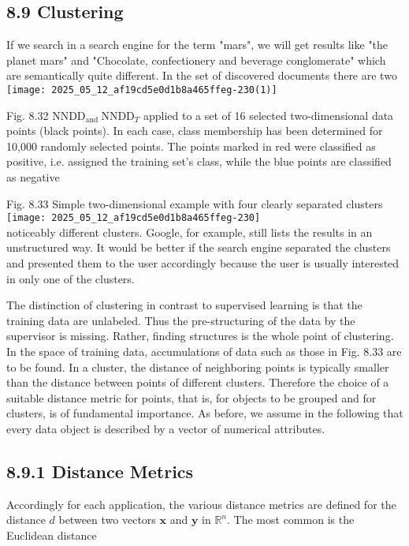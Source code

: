 \documentclass[10pt]{article}
\begin{document}
\subsection*{8.9 Clustering}
If we search in a search engine for the term "mars", we will get results like "the planet mars" and "Chocolate, confectionery and beverage conglomerate" which are semantically quite different. In the set of discovered documents there are two\\
\texttt{[image: 2025\_05\_12\_af19cd5e0d1b8a465ffeg-230(1)]}

Fig. 8.32 $\mathrm{NNDD}_{\text {and }} \mathrm{NNDD}_{T}$ applied to a set of 16 selected two-dimensional data points (black points). In each case, class membership has been determined for 10,000 randomly selected points. The points marked in red were classified as positive, i.e. assigned the training set's class, while the blue points are classified as negative

Fig. 8.33 Simple two-dimensional example with four clearly separated clusters\\
\texttt{[image: 2025\_05\_12\_af19cd5e0d1b8a465ffeg-230]}\\
noticeably different clusters. Google, for example, still lists the results in an unstructured way. It would be better if the search engine separated the clusters and presented them to the user accordingly because the user is usually interested in only one of the clusters.

The distinction of clustering in contrast to supervised learning is that the training data are unlabeled. Thus the pre-structuring of the data by the supervisor is missing. Rather, finding structures is the whole point of clustering. In the space of training data, accumulations of data such as those in Fig. 8.33 are to be found. In a cluster, the distance of neighboring points is typically smaller than the distance between points of different clusters. Therefore the choice of a suitable distance metric for points, that is, for objects to be grouped and for clusters, is of fundamental importance. As before, we assume in the following that every data object is described by a vector of numerical attributes.

\subsection*{8.9.1 Distance Metrics}
Accordingly for each application, the various distance metrics are defined for the distance $d$ between two vectors $\boldsymbol{x}$ and $\boldsymbol{y}$ in $\mathbb{R}^{n}$. The most common is the Euclidean distance
\end{document}
